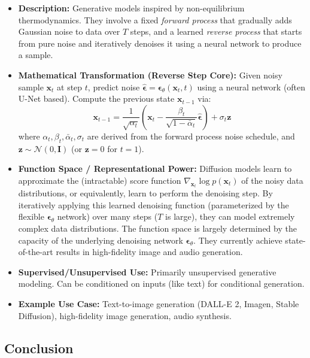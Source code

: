 \documentclass{article}
\newcommand{\bz}{\bm{z}}
\newcommand{\bx}{\bm{x}}
\newcommand{\bepsilon}{\bm{\epsilon}}
\newcommand{\bI}{\mathbf{I}}
\begin{document}
\begin{itemize}
    \item \textbf{Description:} Generative models inspired by non-equilibrium thermodynamics. They involve a fixed \emph{forward process} that gradually adds Gaussian noise to data over $T$ steps, and a learned \emph{reverse process} that starts from pure noise and iteratively denoises it using a neural network to produce a sample.
    \item \textbf{Mathematical Transformation (Reverse Step Core):}
        Given noisy sample $\bx_t$ at step $t$, predict noise $\hat{\bepsilon} = \bepsilon_\theta(\bx_t, t)$ using a neural network (often U-Net based). Compute the previous state $\bx_{t-1}$ via:
        \begin{equation}
             \bx_{t-1} = \frac{1}{\sqrt{\alpha_t}} \left( \bx_t - \frac{\beta_t}{\sqrt{1 - \bar{\alpha}_t}} \hat{\bepsilon} \right) + \sigma_t \bz
        \end{equation}
        where $\alpha_t, \beta_t, \bar{\alpha}_t, \sigma_t$ are derived from the forward process noise schedule, and $\bz \sim \mathcal{N}(0, \bI)$ (or $\bz=0$ for $t=1$).
    \item \textbf{Function Space / Representational Power:} Diffusion models learn to approximate the (intractable) score function $\nabla_{\bx_t} \log p(\bx_t)$ of the noisy data distributions, or equivalently, learn to perform the denoising step. By iteratively applying this learned denoising function (parameterized by the flexible $\bepsilon_\theta$ network) over many steps ($T$ is large), they can model extremely complex data distributions. The function space is largely determined by the capacity of the underlying denoising network $\bepsilon_\theta$. They currently achieve state-of-the-art results in high-fidelity image and audio generation.
    \item \textbf{Supervised/Unsupervised Use:} Primarily unsupervised generative modeling. Can be conditioned on inputs (like text) for conditional generation.
    \item \textbf{Example Use Case:} Text-to-image generation (DALL-E 2, Imagen, Stable Diffusion), high-fidelity image generation, audio synthesis.
\end{itemize}

\subsection{Conclusion}
\end{document}
